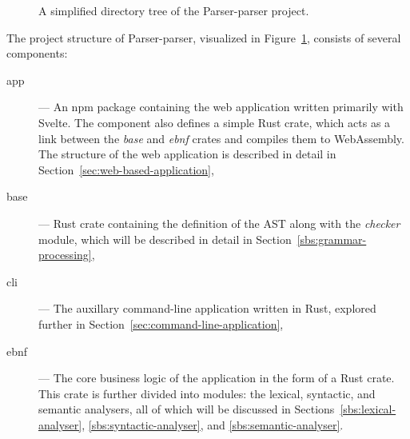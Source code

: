 \documentclass[english,bachelors,forcepolishlogotype]{wizthesis}
\newcommand{\thisproject}{Parser-parser}
\begin{document}
\begin{figure}[H]
  \centering
  \caption{A simplified directory tree of the \thisproject{} project.}
  \label{fig:file-tree}
\end{figure}

The project structure of \thisproject{}, visualized in
Figure~\ref{fig:file-tree}, consists of several components:
\begin{description}
  \item[app] --- An npm package containing the web application written primarily
  with Svelte. The component also defines a simple Rust crate, which acts as a
  link between the \emph{base} and \emph{ebnf} crates and compiles them to
  WebAssembly. The structure of the web application is described in detail in
  Section~\ref{sec:web-based-application},
  \item[base] --- Rust crate containing the definition of the AST along with the
  \emph{checker} module, which will be described in detail in
  Section~\ref{sbs:grammar-processing},
  \item[cli] --- The auxillary command-line application written in Rust,
  explored further in Section~\ref{sec:command-line-application},
  \item[ebnf] --- The core business logic of the application in the form of a
  Rust crate. This crate is further divided into modules: the lexical,
  syntactic, and semantic analysers, all of which will be discussed in
  Sections~\ref{sbs:lexical-analyser}, \ref{sbs:syntactic-analyser}, and
  \ref{sbs:semantic-analyser}.
\end{description}
\end{document}

